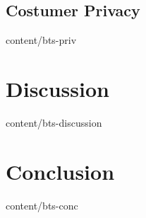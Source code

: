 \documentclass[conference,final,10pt,a4paper]{IEEEtran}
\begin{document}
\subsection    { Costumer Privacy                }  { content/bts-priv           } 

\section       { Discussion                      }  { content/bts-discussion     } 

\section       { Conclusion                      }  { content/bts-conc           } 


\end{document}
